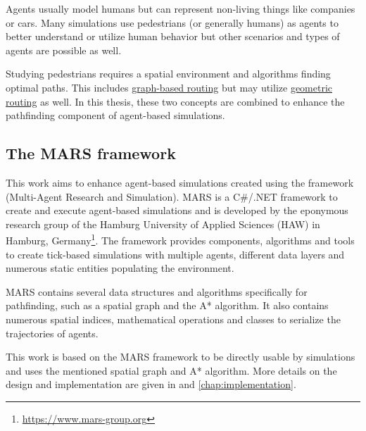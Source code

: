 	Agents usually model humans but can represent non-living things like companies or cars.
	Many simulations use pedestrians (or generally humans) as agents to better understand or utilize human behavior but other scenarios and types of agents are possible as well\cite{macal-introductory-tutorial}.

	Studying pedestrians requires a spatial environment and algorithms finding optimal paths\cite{kneidl-borrmann-hartmann-navigation,gloor-hybrid-pedestrian-routing,teknomo-millonig-routing}.
	This includes \hyperref[sec:graph-routing]{graph-based routing} but may utilize \hyperref[sec:geometric-routing]{geometric routing} as well\cite{kneidl-borrmann-hartmann-navigation}.
	In this thesis, these two concepts are combined to enhance the pathfinding component of agent-based simulations.
	
	\subsection{The MARS framework}
	
		This work aims to enhance agent-based simulations created using the framework  (Multi-Agent Research and Simulation).
		MARS is a C\#/.NET framework to create and execute agent-based simulations and is developed by the eponymous research group of the Hamburg University of Applied Sciences (HAW) in Hamburg, Germany\footnote{\url{https://www.mars-group.org}}.
		The framework provides components, algorithms and tools to create tick-based simulations with multiple agents, different data layers and numerous static entities populating the environment.
		
		MARS contains several data structures and algorithms specifically for pathfinding, such as a spatial graph and the A* algorithm.
		It also contains numerous spatial indices, mathematical operations and classes to serialize the trajectories of agents.
		 
		This work is based on the MARS framework to be directly usable by simulations and uses the mentioned spatial graph and A* algorithm.
		More details on the design and implementation are given in  and \ref{chap:implementation}.